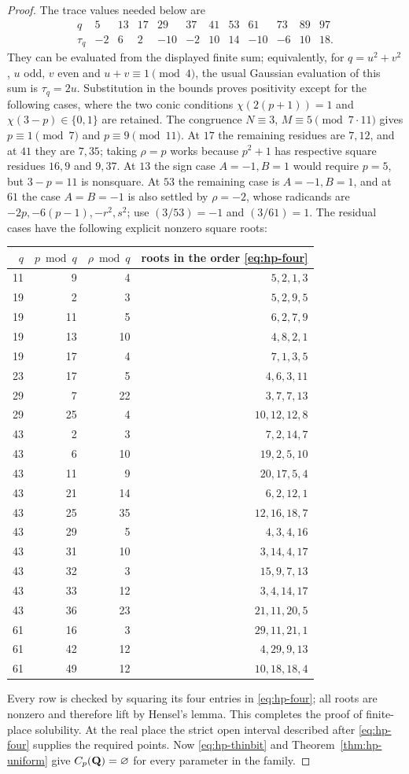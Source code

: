 \begin{proof}
The trace values needed below are
\[
\begin{array}{c|rrrrrrrrrrr}
q&5&13&17&29&37&41&53&61&73&89&97\\\hline
\tau_q&-2&6&2&-10&-2&10&14&-10&-6&10&18.
\end{array}
\]
They can be evaluated from the displayed finite sum; equivalently,
for $q=u^2+v^2$, $u$ odd, $v$ even and $u+v\equiv1\pmod4$, the
usual Gaussian evaluation of this sum is $\tau_q=2u$.
Substitution in the bounds proves positivity except for the following
cases, where the two conic conditions
$\chi(2(p+1))=1$ and $\chi(3-p)\in\{0,1\}$ are retained.
The congruence $N\equiv3$, $M\equiv5\pmod {7\cdot11}$ gives
$p\equiv1\pmod7$ and $p\equiv9\pmod {11}$.
At $17$ the remaining residues are $7,12$, and at $41$ they are
$7,35$; taking $\rho=p$ works because $p^2+1$ has respective square
residues $16,9$ and $9,37$.
At $13$ the sign case $A=-1,B=1$ would require $p=5$, but
$3-p=11$ is nonsquare.
At $53$ the remaining case is $A=-1,B=1$, and at $61$ the case
$A=B=-1$ is also settled by $\rho=-2$, whose radicands are
$-2p,-6(p-1),-r^2,s^2$; use $(3/53)=-1$ and $(3/61)=1$.
The residual cases have the following explicit nonzero square roots:
\begin{center}\small
\begin{tabular}{rrrr}
\toprule
$q$&$p\bmod q$&$\rho\bmod q$&roots in the order \eqref{eq:hp-four}\\
\midrule
11&9&4&$5,2,1,3$\\
19&2&3&$5,2,9,5$\\
19&11&5&$6,2,7,9$\\
19&13&10&$4,8,2,1$\\
19&17&4&$7,1,3,5$\\
23&17&5&$4,6,3,11$\\
29&7&22&$3,7,7,13$\\
29&25&4&$10,12,12,8$\\
43&2&3&$7,2,14,7$\\
43&6&10&$19,2,5,10$\\
43&11&9&$20,17,5,4$\\
43&21&14&$6,2,12,1$\\
43&25&35&$12,16,18,7$\\
43&29&5&$4,3,4,16$\\
43&31&10&$3,14,4,17$\\
43&32&3&$15,9,7,13$\\
43&33&12&$3,4,14,17$\\
43&36&23&$21,11,20,5$\\
61&16&3&$29,11,21,1$\\
61&42&12&$4,29,9,13$\\
61&49&12&$10,18,18,4$\\
\bottomrule
\end{tabular}
\end{center}
Every row is checked by squaring its four entries in \eqref{eq:hp-four};
all roots are nonzero and therefore lift by Hensel's lemma.
This completes the proof of finite-place solubility.
At the real place the strict open interval described after
\eqref{eq:hp-four} supplies the required points.
Now \eqref{eq:hp-thinbit} and Theorem~\ref{thm:hp-uniform} give
$C_p(\mathbf Q)=\varnothing$ for every parameter in the family.


\end{proof}
